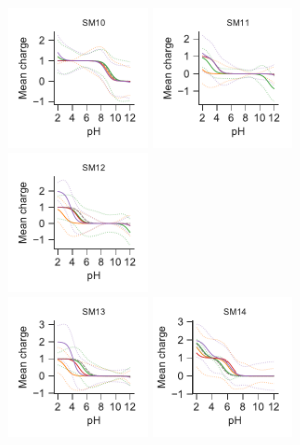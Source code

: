 \documentclass[9pt,lineno,final]{elife}
\begin{document}
	
\begin{figure}[H]	
	\centering
	\includegraphics[width=0.33\textwidth]{Reports/overview-virtual-titration-SM10.pdf}
	\includegraphics[width=0.33\textwidth]{Reports/overview-virtual-titration-SM11.pdf}
	\includegraphics[width=0.33\textwidth]{Reports/overview-virtual-titration-SM12.pdf}	 \\
	\includegraphics[width=0.33\textwidth]{Reports/overview-virtual-titration-SM13.pdf}
	\includegraphics[width=0.33\textwidth]{Reports/overview-virtual-titration-SM14.pdf}

\end{figure}
\end{document}
